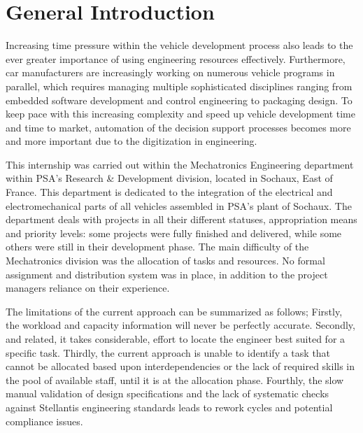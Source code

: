 
\chapter{General Introduction}
\label{chap:introduction}

Increasing time pressure within the vehicle development process also leads to the ever greater importance of using engineering resources effectively. Furthermore, car manufacturers are increasingly working on numerous vehicle programs in parallel,  which requires managing multiple sophisticated disciplines ranging from embedded software development and control engineering to packaging design.  To keep pace with this increasing complexity and speed up vehicle development time and time to market,  automation of the decision support processes becomes more and more important due to the digitization in engineering.

\vspace{0.3cm}

This internship was carried out within the Mechatronics Engineering department within PSA's Research \& Development division, located in Sochaux, East of France. This department is dedicated to the integration of the electrical and electromechanical parts of all vehicles assembled in PSA's plant of Sochaux.  The department deals with projects in all their different statuses,  appropriation means and priority levels: some projects were fully finished and delivered, while some others were still in their development phase.  The main difficulty of the Mechatronics division was the allocation of tasks and resources. No formal assignment and distribution system was in place, in addition to the project managers reliance on their experience.

\vspace{0.3cm}

The limitations of the current approach can be summarized as follows; Firstly, the workload and capacity information will never be perfectly accurate. Secondly,  and related, it takes considerable,  effort to locate the engineer best suited for a specific task.  Thirdly,  the current approach is unable to identify a task that cannot be allocated based upon interdependencies or the lack of required skills in the pool of available staff, until it is at the allocation phase. Fourthly, the slow manual validation of design specifications and the lack of systematic checks against Stellantis engineering standards leads to rework cycles and potential compliance issues.

